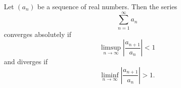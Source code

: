 \documentclass{article}
\begin{document}
Let $(a_n)$ be a sequence of real numbers. Then the series
$$\sum_{n=1}^\infty a_n$$
converges absolutely if
$$\limsup_{n\to\infty} \left|\frac{a_{n+1}}{a_n}\right|<1$$ 
and diverges if
$$\liminf_{n\to\infty} \left|\frac{a_{n+1}}{a_n}\right|>1.$$
\end{document}
